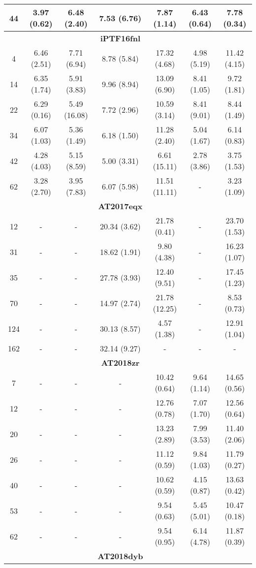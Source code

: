 \documentclass[structabstract]{aa}
\begin{document}
\begin{small}
\begin{longtable}{c c c c c c c}
44	&	3.97 (0.62)	&	6.48 (2.40)	&	7.53 (6.76)	&	7.87 (1.14)	&	6.43 (0.64)	&	7.78 (0.34)  \\ \hline
	&		&		&	\textbf{iPTF16fnl}	&		&		&	\\ \hline
4	&	6.46 (2.51)	&	7.71 (6.94)	&	8.78 (5.84)	&	17.32 (4.68)	&	4.98 (5.19)	&	11.42 (4.15)  \\
14	&	6.35 (1.74)	&	5.91 (3.83)	&	9.96 (8.94)	&	13.09 (6.90)	&	8.41 (1.05)	&	9.72 (1.81)  \\
22	&	6.29 (0.16)	&	5.49 (16.08)	&	7.72 (2.96)	&	10.59 (3.14)	&	8.41 (9.01)	&	8.44 (1.49)  \\
34	&	6.07 (1.03)	&	5.36 (1.49)	&	6.18 (1.50)	&	11.28 (2.40)	&	5.04 (1.67)	&	6.14 (0.83)  \\
42	&	4.28 (4.03)	&	5.15 (8.59)	&	5.00 (3.31)	&	6.61 (15.11)	&	2.78 (3.86)	&	3.75 (1.53)  \\
62	&	3.28 (2.70)	&	3.95 (7.83)	&	6.07 (5.98)	&	11.51 (11.11)	&	-	&	3.23 (1.09)  \\ \hline
	&		&		&	\textbf{AT2017eqx}	&		&		&	\\ \hline
12	&	-	&	-	&	20.34 (3.62)	&	21.78 (0.41)	&	-	&	23.70 (1.53)  \\
31	&	-	&	-	&	18.62 (1.91)	&	9.80 (4.38)	&	-	&	16.23 (1.07)  \\
35	&	-	&	-	&	27.78 (3.93)	&	12.40 (9.51)	&	-	&	17.45 (1.23)  \\
70	&	-	&	-	&	14.97 (2.74)	&	21.78 (12.25)	&	-	&	8.53 (0.73)  \\
124	&	-	&	-	&	30.13 (8.57)	&	4.57 (1.38)	&	-	&	12.91 (1.04)  \\
162	&	-	&	-	&	32.14 (9.27)	&	-	&	-	&	- \\  \hline
	&		&		&	\textbf{AT2018zr}	&		&		&	\\ \hline
7	&	-	&	-	&	-	&	10.42 (0.64)	&	9.64 (1.14)	&	14.65 (0.56)  \\
12	&	-	&	-	&	-	&	12.76 (0.78)	&	7.07 (1.70)	&	12.56 (0.64)  \\
20	&	-	&	-	&	-	&	13.23 (2.89)	&	7.99 (3.53)	&	11.40 (2.06)  \\
26	&	-	&	-	&	-	&	11.12 (0.59)	&	9.84 (1.03)	&	11.79 (0.27)  \\
40	&	-	&	-	&	-	&	10.62 (0.59)	&	4.15 (0.87)	&	13.63 (0.42)  \\
53	&	-	&	-	&	-	&	9.54 (0.63)	&	5.45 (5.01)	&	10.47 (0.18)  \\
62	&	-	&	-	&	-	&	9.54 (0.95)	&	6.14 (4.78)	&	11.87 (0.39)  \\ \hline
	&		&		&	\textbf{AT2018dyb}	&		&		&	\\ \hline

\end{longtable}
\end{small}
\end{document}
